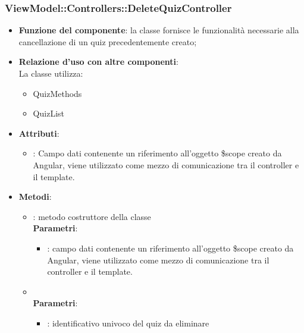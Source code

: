 \subsubsection{ViewModel::Controllers::DeleteQuizController}
\begin{itemize}
\item\textbf{Funzione del componente}: la classe fornisce le funzionalità necessarie alla cancellazione di un quiz precedentemente creato;
	\item\textbf{Relazione d'uso con altre componenti}: \\
La classe utilizza:
	\begin{itemize}
		\item QuizMethods
		\item QuizList
	\end{itemize}
\item\textbf{Attributi}:
	\begin{itemize}
		\item{}: Campo dati contenente un riferimento all’oggetto \$scope creato da Angular, viene utilizzato come mezzo di comunicazione tra il controller e il template.\\
	\end{itemize}
\item\textbf{Metodi}:
	\begin{itemize}
		\item{}: metodo costruttore della classe\\
		\textbf{Parametri}:
			\begin{itemize}
				\item{}: campo dati contenente un riferimento all’oggetto \$scope creato da Angular, viene utilizzato come mezzo di comunicazione tra il controller e il template.\\
			\end{itemize}
		\item{}\\
		\textbf{Parametri}:
			\begin{itemize}
				\item{}: identificativo univoco del quiz da eliminare\\
			\end{itemize}
	\end{itemize}
\end{itemize}

